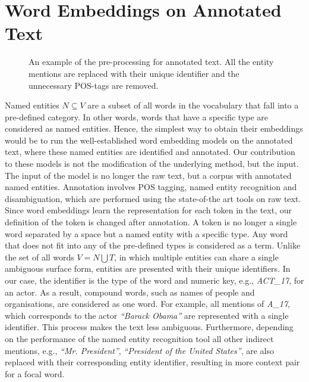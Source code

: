 \section{Word Embeddings on Annotated Text}\label{sec:annotated}
\begin{figure}
\centering 
\resizebox{0.85\textwidth}{0.28\textwidth}{      

}
\caption{An example of the pre-processing for annotated text. All the entity mentions are replaced with their unique identifier and the unnecessary POS-tags are removed.}
\label{fig:annotation}
\end{figure}
Named entities $N \subseteq V$ are a subset of all words in the vocabulary that fall into a pre-defined category.
In other words, words that have a specific type are considered as named entities. Hence, the simplest way to obtain their embeddings would be to run the well-established word embedding models on the annotated text, where these named entities are identified and annotated. Our contribution to these models is not the modification of the underlying method, but the input. The input of the model is no longer the raw text, but a corpus with annotated named entities. Annotation involves POS tagging, named entity recognition and disambiguation, which are performed using the state-of-the art tools on raw text.
Since word embeddings learn the representation for each token in the text, our definition of the token is changed after annotation. A token is no longer a single word separated by a space but a named entity with a specific type. Any word that does not fit into any of the pre-defined types is considered as a term. Unlike the set of all words $V=N \bigcup T $, in which multiple entities can share a single ambiguous surface form, entities are presented with their unique identifiers. In our case, the identifier is the type of the word and numeric key, e.g., \emph{ACT\_17}, for an actor. As a result, compound words, such as names of people and organisations, are considered as one word. For example, all mentions of \emph{A\_17}, which corresponds to the actor \emph{``Barack Obama''} are represented with a single identifier.
This process makes the text less ambiguous.
Furthermore, depending on the performance of the named entity recognition tool all other indirect mentions, e.g., \emph{``Mr. President''}, \emph{``President of the United States''}, are also replaced with their corresponding entity identifier, resulting in more context pair for a focal word.
